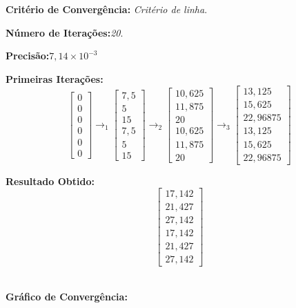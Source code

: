 \documentclass[
12pt,				%
openright,			%
twoside,			%
a4paper,			%
english,			%
french,				%
spanish,			%
brazil				%
]{abntex2_new}
\begin{document}
		\begin{alineas}
			\item{\textbf{Critério de Convergência:} \textit{Critério de linha}.}
			\item{\textbf{Número de Iterações:}\textit{20}.}
			\item{\textbf{Precisão:}\textit{$7,14 \times 10^{-3}$}}
			\item{\textbf{Primeiras Iterações:}\\
				$$	\begin{bmatrix}
				0\\
				0\\
				0\\
				0\\
				0\\
				0
				\end{bmatrix} \rightarrow_1
				\begin{bmatrix}
				7,5\\
				5\\
				15\\
				7,5\\
				5\\
				15
				\end{bmatrix} \rightarrow_2
				\begin{bmatrix}
				10,625\\
				11,875\\
				20\\
				10,625\\
				11,875\\
				20
				\end{bmatrix} \rightarrow_3
				\begin{bmatrix}
				13,125\\
				15,625\\
				22,96875\\
				13,125\\
				15,625\\
				22,96875
				\end{bmatrix}$$
			}
			\item{\textbf{Resultado Obtido:}}\\
			$$\begin{bmatrix}
			17,142\\
			21,427\\
			27,142\\
			17,142\\
			21,427\\
			27,142
			\end{bmatrix}$$\\
			\clearpage
			\item{\textbf{Gráfico de Convergência:}}
			

\end{alineas}
\end{document}
